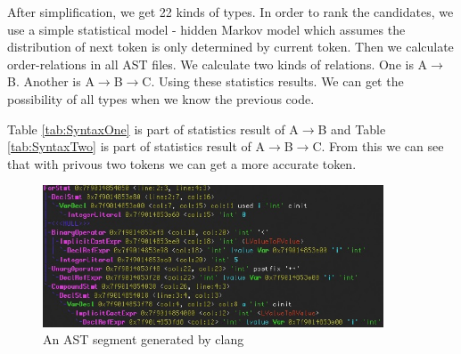 \documentclass[prodmode,acmtecs]{acmsmall} %
\begin{document}
After simplification, we get 22 kinds of types. In order to rank the candidates, we use a simple statistical model - hidden Markov model which assumes the distribution of next token is only determined by current token\cite{rabiner1986introduction}. Then we calculate order-relations in all AST files. We calculate two kinds of relations. One is A$\longrightarrow$B. Another is A$\longrightarrow$B$\longrightarrow$C. Using these statistics results. We can get the possibility of all types when we know the previous code. 

Table \ref{tab:SyntaxOne} is part of statistics result of A$\longrightarrow$B and Table \ref{tab:SyntaxTwo} is part of statistics result of A$\longrightarrow$B$\longrightarrow$C. From this we can see that with privous two tokens we can get a more accurate token.


\begin{figure}
\centerline{\includegraphics[width=0.9\textwidth]{ast_example.jpg}}
\caption{An AST segment generated by clang}
\label{fig:ast example}
\end{figure}


\begin{table}%
\end{table}%
\end{document}
